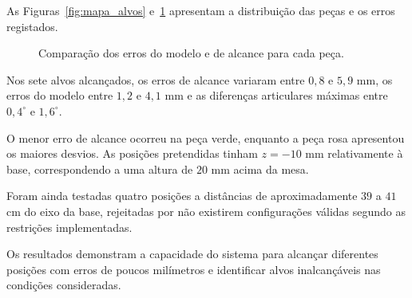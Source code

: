 As Figuras~\ref{fig:mapa_alvos} e~\ref{fig:erros} apresentam a distribuição das peças e os erros registados.

\begin{figure}[htbp]
    \centering
    \begin{minipage}[b]{0.48\textwidth}
        \centering
        
        \caption{Distribuição das peças no referencial da base, numa vista superior.}
        \label{fig:mapa_alvos}
    \end{minipage}
    \hfill
    \begin{minipage}[b]{0.48\textwidth}
        \centering
        
        \caption{Comparação dos erros do modelo e de alcance para cada peça.}
        \label{fig:erros}
    \end{minipage}
\end{figure}

Nos sete alvos alcançados, os erros de alcance variaram entre $0{,}8$ e $5{,}9$ mm, os erros do modelo entre $1{,}2$ e $4{,}1$ mm e as diferenças articulares máximas entre $0{,}4^\circ$ e $1{,}6^\circ$.

O menor erro de alcance ocorreu na peça verde, enquanto a peça rosa apresentou os maiores desvios. As posições pretendidas tinham $z=-10$ mm relativamente à base, correspondendo a uma altura de $20$ mm acima da mesa.

Foram ainda testadas quatro posições a distâncias de aproximadamente $39$ a $41$ cm do eixo da base, rejeitadas por não existirem configurações válidas segundo as restrições implementadas.

Os resultados demonstram a capacidade do sistema para alcançar diferentes posições com erros de poucos milímetros e identificar alvos inalcançáveis nas condições consideradas.
